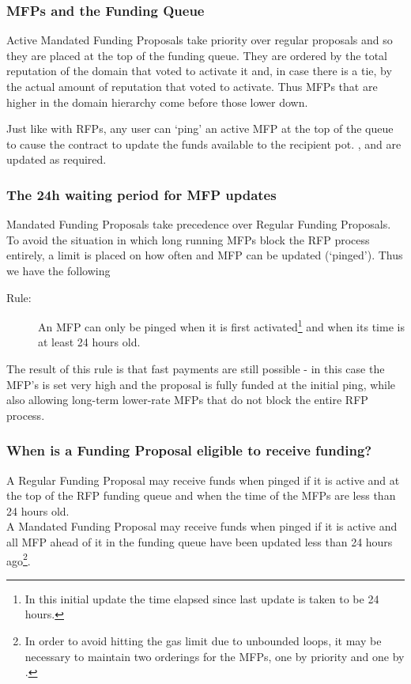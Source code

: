 \subsubsection*{MFPs and the Funding Queue}

Active Mandated Funding Proposals take priority over regular proposals and so they are placed at the top of the funding queue. They are ordered by the total reputation of the domain that voted to activate it and, in case there is a tie, by the actual amount of reputation that voted to activate. Thus MFPs that are higher in the domain hierarchy come before those lower down.

Just like with RFPs, any user can `ping' an active MFP at the top of the queue to cause the contract to update the funds available to the recipient pot. ,  and  are updated as required.

\subsubsection*{The 24h waiting period for MFP updates}
Mandated Funding Proposals take precedence over Regular Funding Proposals. To avoid the situation in which long running MFPs block the RFP process entirely, a limit is placed on how often and MFP can be updated (`pinged'). Thus we have the following
\begin{description}
 \item[Rule:] An MFP can only be pinged when it is first activated\footnote{In this initial update the time elapsed since last update is taken to be 24 hours.} and when its  time is at least 24 hours old.
\end{description}

The result of this rule is that fast payments are still possible - in this case the MFP's  is set very high and the proposal is fully funded at the initial ping, while also allowing long-term lower-rate MFPs that do not block the entire RFP process.

\subsubsection*{When is a Funding Proposal eligible to receive funding?}
A Regular Funding Proposal may receive funds when pinged if it is active and at the top of the RFP funding queue and when the  time of the MFPs are less than 24 hours old.\\
A Mandated Funding Proposal may receive funds when pinged if it is active and all MFP ahead of it in the funding queue have been updated less than 24 hours ago\footnote{In order to avoid hitting the gas limit due to unbounded loops, it may be necessary to maintain two orderings for the MFPs, one by priority and one by . }.

